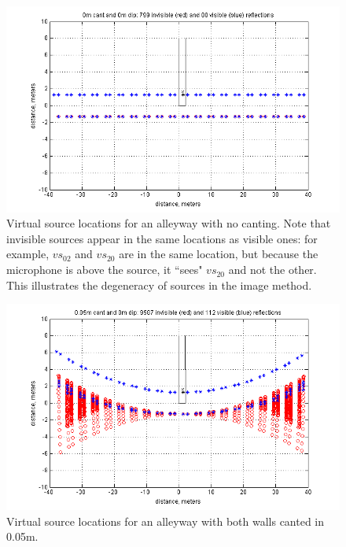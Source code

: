 \documentclass{aes137}
\begin{document}
\begin{figure}[h!] \centering \includegraphics[width=\linewidth, trim=13mm 2mm 10mm 3mm, clip]{images/ISM_0m_cant_0m_dip.png} 
\caption{Virtual source locations for an alleyway with no canting. Note that invisible sources appear in the same locations as visible ones: for example, $vs_{02}$ and $vs_{20}$ are in the same location, but because the microphone is above the source, it ``sees" $vs_{20}$ and not the other. This illustrates the degeneracy of sources in the image method.} 
\end{figure}

\begin{figure}[h!] \centering \includegraphics[width=\linewidth, trim=13mm 2mm 10mm 3mm, clip]{images/ISM_0pt05m_cant_0m_dip.png} 
\caption{Virtual source locations for an alleyway with both walls canted in 0.05m.} 
\end{figure}
\end{document}
